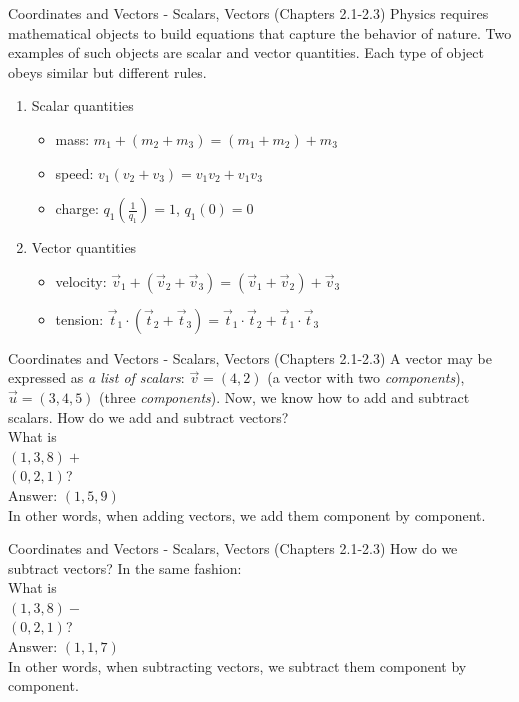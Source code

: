 \documentclass{beamer}
\begin{document}
\begin{frame}{Coordinates and Vectors - Scalars, Vectors (Chapters 2.1-2.3)}
Physics requires \alert{mathematical objects} to build equations that capture the behavior of nature.  Two examples of such objects are \alert{scalar} and \alert{vector} quantities.  Each type of object obeys similar but different rules.
\begin{enumerate}
\item Scalar quantities
\begin{itemize}
\item mass: $m_1+(m_2+m_3) = (m_1+m_2)+m_3$
\item speed: $v_1(v_2+v_3) = v_1v_2+v_1v_3$
\item charge: $q_1 \left(\frac{1}{q_1}\right) = 1$, $q_1(0) = 0$
\end{itemize}
\item Vector quantities
\begin{itemize}
\item velocity: $\vec{v}_1 + (\vec{v}_2+\vec{v}_3) = (\vec{v}_1 + \vec{v}_2)+\vec{v}_3$
\item tension: $\vec{t}_1 \cdot (\vec{t}_2 + \vec{t}_3) = \vec{t}_1 \cdot \vec{t}_2 + \vec{t}_1 \cdot \vec{t}_3$
\end{itemize}
\end{enumerate}
\end{frame}

\begin{frame}{Coordinates and Vectors - Scalars, Vectors (Chapters 2.1-2.3)}
A vector may be expressed as \textit{a list of scalars}: $\vec{v} = (4,2)$ (a vector with two \textit{components}), $\vec{u} = (3,4,5)$ (three \textit{components}).  Now, we know how to add and subtract scalars.  How do we add and subtract vectors? \\
\vspace{0.5cm}
What is\\
$(1,3,8)+$\\ $(0,2,1)$? \\
Answer: $(1,5,9)$ \\
\vspace{0.5cm}
In other words, when adding vectors, we add them component by component.
\end{frame}

\begin{frame}{Coordinates and Vectors - Scalars, Vectors (Chapters 2.1-2.3)}
How do we subtract vectors? In the same fashion:\\
\vspace{0.5cm}
What is\\
$(1,3,8)-$\\ $(0,2,1)$? \\
Answer: $(1,1,7)$ \\
\vspace{0.5cm}
In other words, when subtracting vectors, we subtract them component by component.
\end{frame}
\end{document}
